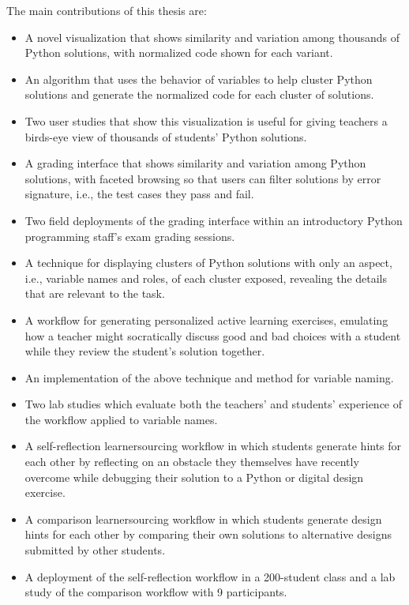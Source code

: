 The main contributions of this thesis are:
\begin{itemize}
\item A novel visualization that shows similarity and variation among thousands of Python solutions, with normalized code shown for each variant. 
\item An algorithm that uses the behavior of variables to help cluster Python solutions and generate the normalized code for each cluster of solutions.
\item Two user studies that show this visualization is useful for giving teachers a birds-eye view of thousands of students' Python solutions.
\item A grading interface that shows similarity and variation among Python solutions, with faceted browsing so that users can filter solutions by error signature, i.e., the test cases they pass and fail. 
\item Two field deployments of the grading interface within an introductory Python programming staff's exam grading sessions.
\item A technique for displaying clusters of Python solutions with only an aspect, i.e., variable names and roles, of each cluster exposed, revealing the details that are relevant to the task. %
\item A workflow for generating personalized active learning exercises, emulating how a teacher might socratically discuss good and bad choices with a student while they review the student's solution together. 
\item An implementation of the above technique and method for variable naming. %
\item Two lab studies which evaluate both the teachers' and students' experience of the workflow applied to variable names.
\item A self-reflection learnersourcing workflow in which students generate hints for each other by reflecting on an obstacle they themselves have recently overcome while debugging their solution to a Python or digital design exercise.
\item A comparison learnersourcing workflow in which students generate design hints for each other by comparing their own solutions to alternative designs submitted by other students.
\item A deployment of the self-reflection workflow in a 200-student class and a lab study of the comparison workflow with 9 participants.
\end{itemize}

